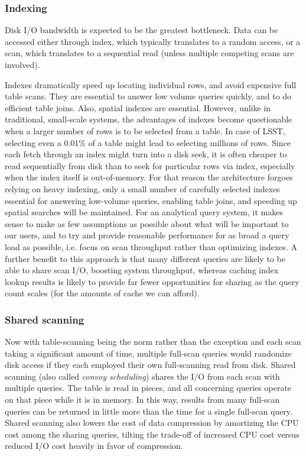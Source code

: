 \documentclass[DM,toc]{lsstdoc}
\begin{document}
\subsubsection{Indexing}\label{indexing}

Disk I/O bandwidth is expected to be the greatest bottleneck. Data can
be accessed either through index, which typically translates to a random
access, or a scan, which translates to a sequential read (unless
multiple competing scans are involved).

Indexes dramatically speed up locating individual rows, and avoid
expensive full table scans. They are essential to answer low volume
queries quickly, and to do efficient table joins. Also, spatial indexes
are essential. However, unlike in traditional, small-scale systems, the
advantages of indexes become questionable when a larger number of rows
is to be selected from a table. In case of LSST, selecting even a 0.01\%
of a table might lead to selecting millions of rows. Since each fetch
through an index might turn into a disk seek, it is often cheaper to
read sequentially from disk than to seek for particular rows via index,
especially when the index itself is out-of-memory. For that reason the
architecture forgoes relying on heavy indexing, only a small number of
carefully selected indexes essential for answering low-volume queries,
enabling table joins, and speeding up spatial searches will be
maintained. For an analytical query system, it makes sense to make as
few assumptions as possible about what will be important to our users,
and to try and provide reasonable performance for as broad a query load
as possible, i.e. focus on scan throughput rather than optimizing
indexes. A further benefit to this approach is that many different
queries are likely to be able to share scan I/O, boosting system
throughput, whereas caching index lookup results is likely to provide
far fewer opportunities for sharing as the query count scales (for the
amounts of cache we can afford).

\subsubsection{Shared scanning}\label{shared-scanning}

Now with table-scanning being the norm rather than the exception and
each scan taking a significant amount of time, multiple full-scan
queries would randomize disk access if they each employed their own
full-scanning read from disk. Shared scanning (also called \emph{convoy
scheduling}) shares the I/O from each scan with multiple queries. The
table is read in pieces, and all concerning queries operate on that
piece while it is in memory. In this way, results from many full-scan
queries can be returned in little more than the time for a single
full-scan query. Shared scanning also lowers the cost of data
compression by amortizing the CPU cost among the sharing queries,
tilting the trade-off of increased CPU cost versus reduced I/O cost
heavily in favor of compression.
\end{document}
